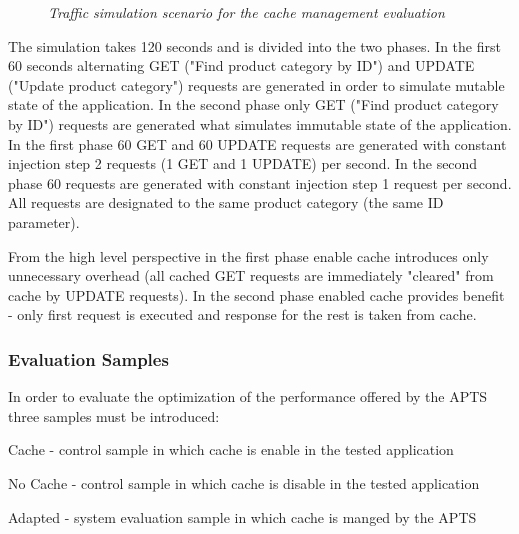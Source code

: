 \documentclass[10pt,a4paper]{article}
\let\tempone\itemize
\let\temptwo\enditemize
\renewenvironment{itemize}{\tempone\addtolength{\itemsep}{-0.4\baselineskip}}{\temptwo}
\begin{document}
\begin{figure}[!htb]
\caption{\textit{Traffic simulation scenario for the cache management evaluation}} \label{trafficcache}
\end{figure}

The simulation takes 120 seconds and is divided into the two phases. In the first 60 seconds alternating GET ("Find product category by ID") and UPDATE ("Update product category") requests are generated in order to simulate mutable state of the application. In the second phase only GET ("Find product category by ID") requests are generated what simulates immutable state of the application. In the first phase 60 GET and 60 UPDATE requests are generated with constant injection step 2 requests (1 GET and 1 UPDATE) per second. In the second phase 60 requests are generated with constant injection step 1 request per second. All requests are designated to the same product category (the same ID parameter). 

From the high level perspective in the first phase enable cache introduces only unnecessary overhead (all cached GET requests are immediately "cleared" from cache by UPDATE requests). In the second phase enabled cache provides benefit - only first request is executed and response for the rest is taken from cache.  

\subsubsection{Evaluation Samples} \label{evaluationsamplescache}

In order to evaluate the optimization of the performance offered by the APTS three  samples must be introduced: 
\begin{itemize}
\item Cache - control sample in which cache is enable in the tested application
\item No Cache - control sample in which cache is disable in the tested application
\item Adapted - system evaluation sample in which cache is manged by the APTS
\end{itemize}
\end{document}
